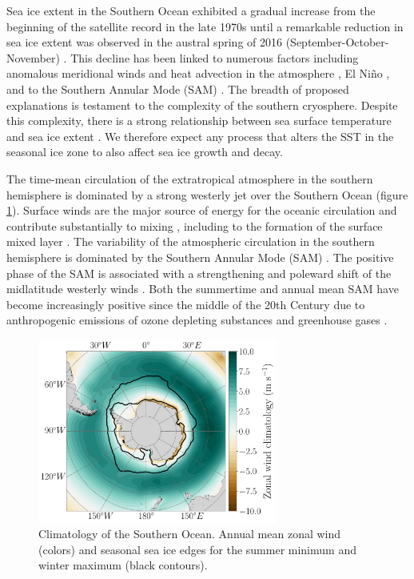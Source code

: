 \documentclass{ametsocV5}
\begin{document}
Sea ice extent in the Southern Ocean exhibited a gradual increase from the beginning of the satellite record in the late 1970s until a remarkable reduction in sea ice extent was observed in the austral spring of 2016 (September-October-November) \citep{Jones2016,Parkinson2012,Scambos2018}. This decline has been linked to numerous factors including anomalous meridional winds and heat advection in the atmosphere \citep{Schlosser2017}, El Ni\~no \citep{Stuecker2017}, and to the Southern Annular Mode (SAM) \citep{Doddridge2017}. The breadth of proposed explanations is testament to the complexity of the southern cryosphere. Despite this complexity, there is a strong relationship between sea surface temperature and sea ice extent \citep{Fan2014}. We therefore expect any process that alters the SST in the seasonal ice zone to also affect sea ice growth and decay.


The time-mean circulation of the extratropical atmosphere in the southern hemisphere is dominated by a strong westerly jet over the Southern Ocean (figure \ref{fig:zonal_wind_clim}). Surface winds are the major source of energy for the oceanic circulation \citep{Wunsch1998} and contribute substantially to mixing \citep{Munk1998}, including to the formation of the surface mixed layer \citep{Pollard1972,Wunsch2004}. The variability of the atmospheric circulation in the southern hemisphere is dominated by the Southern Annular Mode (SAM) \citep{Gong1999,Thompson2000}. The positive phase of the SAM is associated with a strengthening and poleward shift of the midlatitude westerly winds \citep{Thompson2000}. Both the summertime and annual mean SAM have become increasingly positive since the middle of the 20th Century \citep{Jones2016,Marshall2003a} due to anthropogenic emissions of ozone depleting substances and greenhouse gases \citep[see e.g.][]{Polvani2011,Swart2012,Thompson2011a}.


\begin{figure}[!ht] 
    \begin{center} 
        \includegraphics[width=0.7\textwidth]{figures/zonal_wind_clim.pdf} 
        \caption{Climatology of the Southern Ocean. Annual mean zonal wind (colors) and seasonal sea ice edges for the summer minimum and winter maximum (black contours).} 
        \label{fig:zonal_wind_clim} 
    \end{center} 
\end{figure} 
\end{document}
